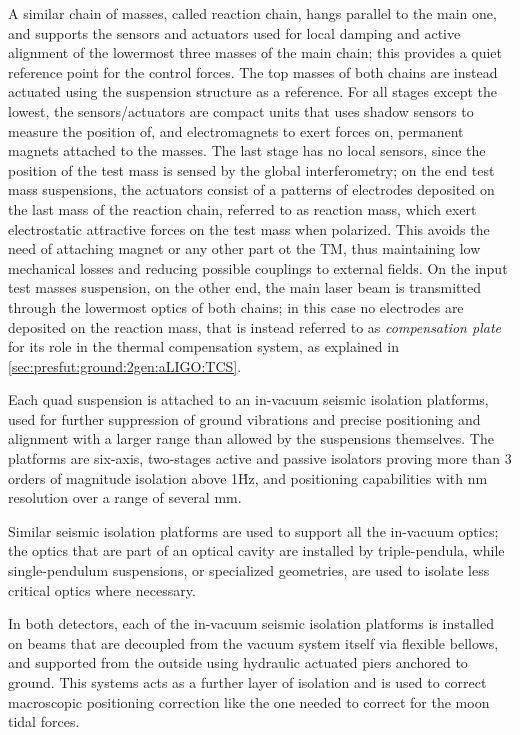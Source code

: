 A similar chain of masses, called reaction chain, hangs parallel to the main one, and supports the sensors and actuators used for local damping and active alignment of the lowermost three masses of the main chain; this provides a quiet reference point for the control forces. The top masses of both chains are instead actuated using the suspension structure as a reference. For all stages except the lowest, the sensors/actuators are compact units that uses shadow sensors to measure the position of, and electromagnets to exert forces on, permanent magnets attached to the masses. The last stage has no local sensors, since the position of the test mass is sensed by the global interferometry; on the end test mass suspensions, the actuators consist of a patterns of electrodes deposited on the last mass of the reaction chain, referred to as reaction mass, which exert electrostatic attractive forces on the test mass when polarized. This avoids the need of attaching magnet or any other part ot the TM, thus maintaining low mechanical losses and reducing possible couplings to external fields. On the input test masses suspension, on the other end, the main laser beam is transmitted through the lowermost optics of both chains; in this case no electrodes are deposited on the reaction mass, that is instead referred to as \textit{compensation plate} for its role in the thermal compensation system, as explained in \ref{sec:presfut:ground:2gen:aLIGO:TCS}.

Each quad suspension is attached to an in-vacuum seismic isolation platforms, used for further suppression of ground vibrations and precise positioning and alignment with a larger range than allowed by the suspensions themselves. The platforms are six-axis, two-stages active and passive isolators proving more than 3 orders of magnitude isolation above 1\.Hz, and positioning capabilities with nm resolution over a range of several mm.

Similar seismic isolation platforms are used to support all the in-vacuum optics; the optics that are part of an optical cavity are installed by triple-pendula, while single-pendulum suspensions, or specialized geometries, are used to isolate less critical optics where necessary.

In both detectors, each of the in-vacuum seismic isolation platforms is installed on beams that are decoupled from the vacuum system itself via flexible bellows, and supported from the outside using hydraulic actuated piers anchored to ground. This systems acts as a further layer of isolation and is used to correct macroscopic positioning correction like the one needed to correct for the moon tidal forces.

